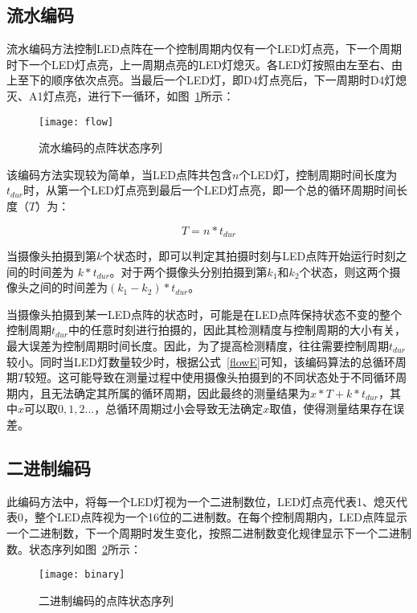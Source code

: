 \subsection{流水编码}

流水编码方法控制LED点阵在一个控制周期内仅有一个LED灯点亮，下一个周期时下一个LED灯点亮，上一周期点亮的LED灯熄灭。各LED灯按照由左至右、由上至下的顺序依次点亮。当最后一个LED灯，即D4灯点亮后，下一周期时D4灯熄灭、A1灯点亮，进行下一循环，如图~\ref{flow}所示：

\begin{figure}[h] 
  \centering
  \texttt{[image: flow]}
  \caption{流水编码的点阵状态序列}
  \label{flow}
\end{figure}

该编码方法实现较为简单，当LED点阵共包含$n$个LED灯，控制周期时间长度为$t_{dur}$时，从第一个LED灯点亮到最后一个LED灯点亮，即一个总的循环周期时间长度（$T$）为：

\begin{equation}
T = n * t_{dur}
  \label{flowE}
\end{equation}

当摄像头拍摄到第$k$个状态时，即可以判定其拍摄时刻与LED点阵开始运行时刻之间的时间差为 $k * t_{dur}$。对于两个摄像头分别拍摄到第$k_1$和$k_2$个状态，则这两个摄像头之间的时间差为$(k_1 - k_2) * t_{dur}$。

当摄像头拍摄到某一LED点阵的状态时，可能是在LED点阵保持状态不变的整个控制周期$t_{dur}$中的任意时刻进行拍摄的，因此其检测精度与控制周期的大小有关，最大误差为控制周期时间长度。因此，为了提高检测精度，往往需要控制周期$t_{dur}$较小。同时当LED灯数量较少时，根据公式~\ref{flowE}可知，该编码算法的总循环周期$T$较短。这可能导致在测量过程中使用摄像头拍摄到的不同状态处于不同循环周期内，且无法确定其所属的循环周期，因此最终的测量结果为$x * T + k * t_{dur}$，其中$x$可以取$0, 1, 2...$，总循环周期过小会导致无法确定$x$取值，使得测量结果存在误差。

\subsection{二进制编码}

此编码方法中，将每一个LED灯视为一个二进制数位，LED灯点亮代表1、熄灭代表0，整个LED点阵视为一个16位的二进制数。在每个控制周期内，LED点阵显示一个二进制数，下一个周期时发生变化，按照二进制数变化规律显示下一个二进制数。状态序列如图~\ref{binary}所示：

\begin{figure}[h] 
  \centering
  \texttt{[image: binary]}
  \caption{二进制编码的点阵状态序列}
  \label{binary}
\end{figure}

